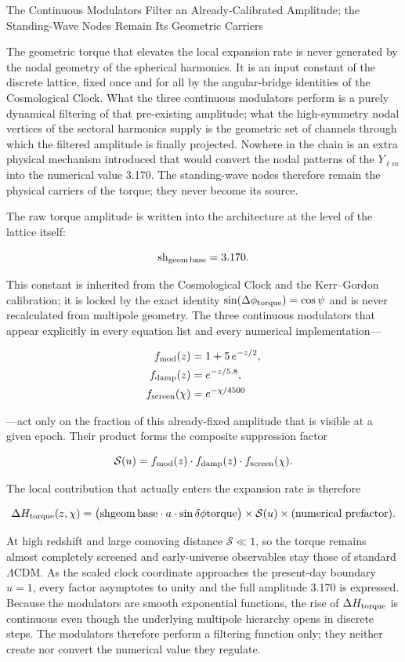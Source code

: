 The Continuous Modulators Filter an Already-Calibrated Amplitude; the Standing-Wave Nodes Remain Its Geometric Carriers

The geometric torque that elevates the local expansion rate is never generated by the nodal geometry of the spherical harmonics. It is an input constant of the discrete lattice, fixed once and for all by the angular-bridge identities of the Cosmological Clock. What the three continuous modulators perform is a purely dynamical filtering of that pre-existing amplitude; what the high-symmetry nodal vertices of the sectoral harmonics supply is the geometric set of channels through which the filtered amplitude is finally projected. Nowhere in the chain is an extra physical mechanism introduced that would convert the nodal patterns of the \(Y_{\ell m}\) into the numerical value 3.170. The standing-wave nodes therefore remain the physical carriers of the torque; they never become its source.

The raw torque amplitude is written into the architecture at the level of the lattice itself:

\[
{\rm sh}_{\rm geom\,base}=3.170.
\]

This constant is inherited from the Cosmological Clock and the Kerr–Gordon calibration; it is locked by the exact identity \(\sin(\Delta\phi_{\rm torque})=\cos\psi\) and is never recalculated from multipole geometry. The three continuous modulators that appear explicitly in every equation list and every numerical implementation—

\[
\begin{align*}
f_{\rm mod}(z)&=1+5\,e^{-z/2},\\
f_{\rm damp}(z)&=e^{-z/5.8},\\
f_{\rm screen}(\chi)&=e^{-\chi/4500}
\end{align*}
\]

—act only on the fraction of this already-fixed amplitude that is visible at a given epoch. Their product forms the composite suppression factor

\[
\mathcal{S}(u)=f_{\rm mod}(z)\cdot f_{\rm damp}(z)\cdot f_{\rm screen}(\chi).
\]

The local contribution that actually enters the expansion rate is therefore

\[
\Delta H_{\rm torque}(z,\chi)=\bigl({\rm sh}{\rm geom\,base}\cdot a\cdot\sin\delta\phi{\rm torque}\bigr)\times\mathcal{S}(u)\times\text{(numerical prefactor)}.
\]

At high redshift and large comoving distance \(\mathcal{S}\ll1\), so the torque remains almost completely screened and early-universe observables stay those of standard \(\Lambda\)CDM. As the scaled clock coordinate approaches the present-day boundary \(u=1\), every factor asymptotes to unity and the full amplitude 3.170 is expressed. Because the modulators are smooth exponential functions, the rise of \(\Delta H_{\rm torque}\) is continuous even though the underlying multipole hierarchy opens in discrete steps. The modulators therefore perform a filtering function only; they neither create nor convert the numerical value they regulate.


